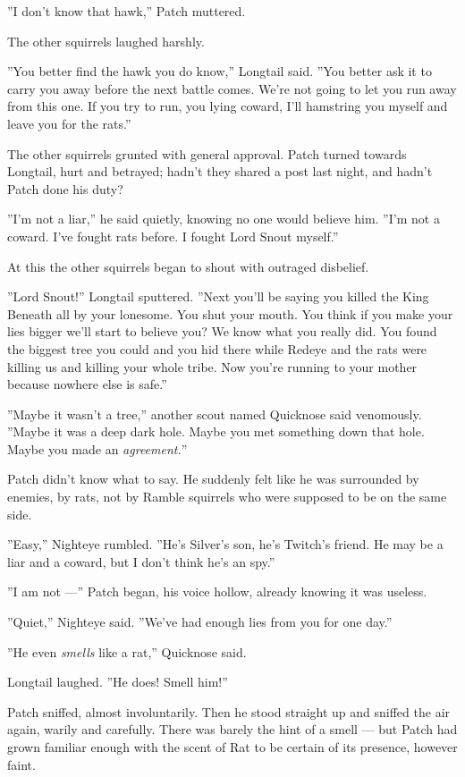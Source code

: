 \documentclass[12pt]{book}
\begin{document}
''I don't know that hawk,'' Patch muttered.

The other squirrels laughed harshly.

''You better find the hawk you do know,'' Longtail said. ''You better
ask it to carry you away before the next battle comes. We're not going
to let you run away from this one. If you try to run, you lying
coward, I'll hamstring you myself and leave you for the rats.''

The other squirrels grunted with general approval. Patch turned
towards Longtail, hurt and betrayed; hadn't they shared a post last
night, and hadn't Patch done his duty?

''I'm not a liar,'' he said quietly, knowing no one would believe
him. ''I'm not a coward. I've fought rats before. I fought Lord Snout
myself.''

At this the other squirrels began to shout with outraged disbelief.

''Lord Snout!'' Longtail sputtered. ''Next you'll be saying you killed
the King Beneath all by your lonesome. You shut your mouth. You think
if you make your lies bigger we'll start to believe you? We know what
you really did. You found the biggest tree you could and you hid there
while Redeye and the rats were killing us and killing your whole
tribe. Now you're running to your mother because nowhere else is
safe.''

''Maybe it wasn't a tree,'' another scout named Quicknose said
venomously. ''Maybe it was a deep dark hole. Maybe you met something
down that hole. Maybe you made an \textit{agreement.}''

Patch didn't know what to say. He suddenly felt like he was surrounded
by enemies, by rats, not by Ramble squirrels who were supposed to be
on the same side.

''Easy,'' Nighteye rumbled. ''He's Silver's son, he's Twitch's
friend. He may be a liar and a coward, but I don't think he's an
spy.''

''I am not ---'' Patch began, his voice hollow, already knowing it was
useless.

''Quiet,'' Nighteye said. ''We've had enough lies from you for one
day.''

''He even \textit{smells} like a rat,'' Quicknose said.

Longtail laughed. ''He does! Smell him!''

Patch sniffed, almost involuntarily. Then he stood straight up and
sniffed the air again, warily and carefully. There was barely the hint
of a smell --- but Patch had grown familiar enough with the scent of
Rat to be certain of its presence, however faint.
\end{document}
